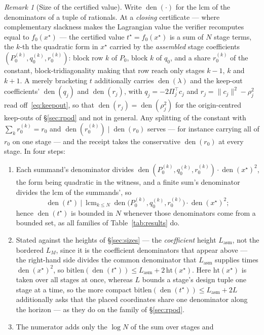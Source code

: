 \documentclass[11pt]{article}
\theoremstyle{definition}
\theoremstyle{remark}
\newtheorem{remark}{Remark}
\DeclareMathOperator{\lcm}{lcm}
\DeclareMathOperator{\den}{den}
\renewcommand{\_}{\ifdim\fontdimen3\font=0pt\relax\char`\_\else\textunderscore\fi\hspace{0pt}}
\begin{document}
\begin{remark}[Size of the certified value]\label{rem:value}
Write $\den(\cdot)$ for the lcm of the denominators of a tuple of rationals.
At a \emph{closing} certificate --- where complementary slackness makes the
Lagrangian value the verifier recomputes equal to $f_0(x^\star)$ --- the
certified value $t^\star=f_0(x^\star)$ is a sum of $N$ stage terms, the
$k$-th the quadratic form in $x^\star$ carried by the \emph{assembled} stage
coefficients $(P_0^{(k)},q_0^{(k)},r_0^{(k)})$: block row $k$ of $P_0$,
block $k$ of $q_0$, and a share $r_0^{(k)}$ of the constant,
block-tridiagonality making that row reach only stages $k{-}1$, $k$ and
$k{+}1$. A merely bracketing $t$ additionally carries $\den(\lambda)$ and the
keep-out coefficients' $\den(q_j)$ and $\den(r_j)$, with
$q_j=-2\Pi_j^\top c_j$ and $r_j=\lVert c_j\rVert^2-\rho_j^2$ read
off~\eqref{eq:keepout}, so that $\den(r_j)=\den(\rho_j^2)$ for the
origin-centred keep-outs of \S\ref{sec:rpod} and not in general. Any
splitting of the constant with $\sum_kr_0^{(k)}=r_0$ and
$\den(r_0^{(k)})\mid\den(r_0)$ serves --- for instance carrying all of $r_0$
on one stage --- and the receipt takes the conservative $\den(r_0)$ at every
stage. In four steps:
\begin{enumerate}
\item[(1)] Each summand's denominator divides
$\den(P_0^{(k)},q_0^{(k)},r_0^{(k)})\cdot\den(x^\star)^2$, the form being
quadratic in the witness, and a finite sum's denominator divides the lcm of
the summands', so
\[
\den(t^\star)\ \Big|\ \lcm_{k\le N}
\den\bigl(P_0^{(k)},q_0^{(k)},r_0^{(k)}\bigr)\cdot\den(x^\star)^2;
\]
hence $\den(t^\star)$ is bounded in $N$ whenever those denominators come
from a bounded set, as all families of Table~\ref{tab:results} do.
\item[(2)] Stated against the heights of \S\ref{sec:sizes} --- the
\emph{coefficient} height $L_{\mathrm{asm}}$, not the bordered $L_M$, since
it is the coefficient denominators that appear above --- the right-hand side
divides the common denominator that $L_{\mathrm{asm}}$ supplies times
$\den(x^\star)^2$, so
$\mathrm{bitlen}(\den(t^\star))\le L_{\mathrm{asm}}+2\,\mathrm{ht}(x^\star)$.
Here $\mathrm{ht}(x^\star)$ is taken over all stages at once, whereas $L$
bounds a stage's design tuple one stage at a time, so the more compact
$\mathrm{bitlen}(\den(t^\star))\le L_{\mathrm{asm}}+2L$ additionally asks
that the placed coordinates share one denominator along the horizon --- as
they do on the family of \S\ref{sec:rpod}.
\item[(3)] The numerator adds only the $\log N$ of the sum over stages and

\end{enumerate}
\end{remark}
\end{document}
